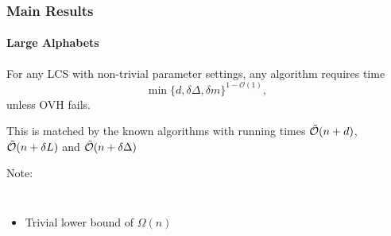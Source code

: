 \begin{frame}
\frametitle{Main Results}
\framesubtitle{Large Alphabets}

\begin{theorem}
For any LCS with non-trivial parameter settings, any algorithm requires time 
\[
\min\{d, \delta \Delta, \delta m\}^{1 - \mathcal{O}(1)},
\] 
unless OVH fails.

This is matched by the known algorithms with running times $\tilde{\mathcal{O}}(n + d)$, $\tilde{\mathcal{O}}(n + \delta L)$ and $\tilde{\mathcal{O}}(n + \delta\Delta)$
\end{theorem}

\pause

\begin{exampleblock}{Note:}
\vspace{-1ex}
\begin{columns}
	\begin{itemize}
		\item Trivial lower bound of $\Omega(n)$
	\end{itemize}
\end{columns}
\end{exampleblock}

\end{frame}


